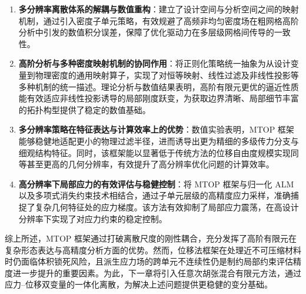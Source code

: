 \begin{enumerate}
	\item \textbf{多分辨率离散体系的解耦与数值重构}：建立了设计空间与分析空间之间的映射机制，通过引入密度子单元策略，有效规避了高频非均匀密度场在粗网格高阶分析中引发的数值积分误差，保障了优化驱动力在多层级网格间传导的一致性。
	
	\item \textbf{高阶分析与多种密度映射机制的协同作用}：将正则化策略统一抽象为从设计变量到物理密度的通用映射算子，实现了对恒等映射、线性过滤及非线性投影等多种机制的统一描述。理论分析与数值结果表明，高阶有限元更优的逼近性质能有效适应非线性投影诱导的局部刚度跃变，为获取边界清晰、局部细节丰富的拓扑构型提供了稳定的数值基础。
	
	\item \textbf{多分辨率策略在特征表达与计算效率上的优势}：数值实验表明，MTOP 框架能够稳健地适配更小的物理过滤半径，进而诱导出更为精细的多级传力分支与细观结构特征。同时，该框架能以显著低于传统方法的位移自由度规模实现同等甚至更高的几何分辨率，有效提升了高分辨率优化问题的计算效率。
	
	\item \textbf{高分辨率下局部应力的有效评估与稳健控制}：将 MTOP 框架与归一化 ALM 以及多项式消失约束技术相结合，通过子单元层级的高精度应力采样，准确捕捉了复杂几何特征处的应力梯度。该方法有效抑制了局部应力震荡，在高设计分辨率下实现了对应力约束的稳定控制。
\end{enumerate}

综上所述，MTOP 框架通过打破离散尺度的刚性耦合，充分发挥了高阶有限元在复杂形态表达与高精度分析方面的优势。然而，位移法框架在处理近不可压缩材料时仍面临体积锁死风险，且派生应力场的跨单元不连续性仍是制约局部约束评估精度进一步提升的重要因素。为此，下一章将引入任意次胡张混合有限元方法，通过应力--位移双变量的一体化离散，为解决上述问题提供更稳健的变分基础。


